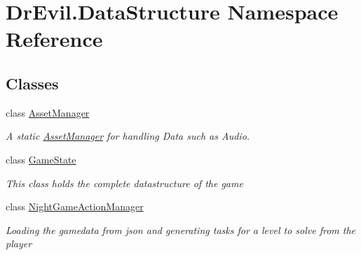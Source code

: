 \hypertarget{namespace_dr_evil_1_1_data_structure}{}\section{Dr\+Evil.\+Data\+Structure Namespace Reference}
\label{namespace_dr_evil_1_1_data_structure}
\subsection*{Classes}
\begin{DoxyCompactItemize}
\item 
class \mbox{\hyperlink{class_dr_evil_1_1_data_structure_1_1_asset_manager}{Asset\+Manager}}
\begin{DoxyCompactList}\small\item\em A static \mbox{\hyperlink{class_dr_evil_1_1_data_structure_1_1_asset_manager}{Asset\+Manager}} for handling Data such as Audio. \end{DoxyCompactList}\item 
class \mbox{\hyperlink{class_dr_evil_1_1_data_structure_1_1_game_state}{Game\+State}}
\begin{DoxyCompactList}\small\item\em This class holds the complete datastructure of the game \end{DoxyCompactList}\item 
class \mbox{\hyperlink{class_dr_evil_1_1_data_structure_1_1_night_game_action_manager}{Night\+Game\+Action\+Manager}}
\begin{DoxyCompactList}\small\item\em Loading the gamedata from json and generating tasks for a level to solve from the player \end{DoxyCompactList}\end{DoxyCompactItemize}
